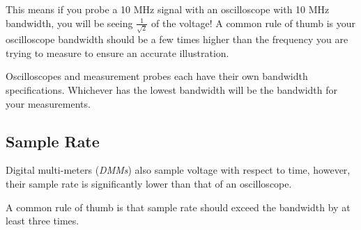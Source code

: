 \documentclass[main.tex]{subfiles}
\begin{document}
This means if you probe a 10 MHz signal with an oscilloscope with 10 MHz bandwidth, you will be seeing $\frac{1}{\sqrt{2}}$ of the voltage! A common rule of thumb is your oscilloscope bandwidth should be a few times higher than the frequency you are trying to measure to ensure an accurate illustration.

Oscilloscopes and measurement probes each have their own bandwidth specifications. Whichever has the lowest bandwidth will be the bandwidth for your measurements.

\subsection{Sample Rate}
Digital multi-meters (\textit{DMMs}) also sample voltage with respect to time, however, their sample rate is significantly lower than that of an oscilloscope.


A common rule of thumb is that sample rate should exceed the bandwidth by at least three times. 
\end{document}
